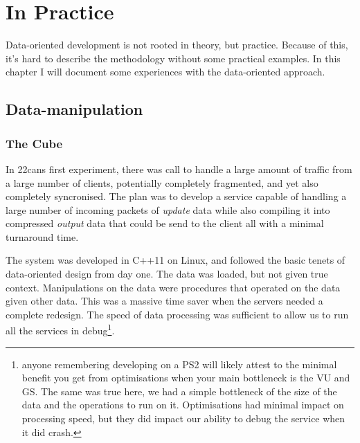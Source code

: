 \chapter{In Practice}\label{chap:inpractice}

Data-oriented development is not rooted in theory, but practice. Because of
this, it's hard to describe the methodology without some practical examples. In
this chapter I will document some experiences with the data-oriented approach.

\section{Data-manipulation}

\subsection{The Cube}

In 22cans first experiment, there was call to handle a large amount of traffic
from a large number of clients, potentially completely fragmented, and yet also
completely syncronised. The plan was to develop a service capable of handling a
large number of incoming packets of \emph{update} data while also compiling it
into compressed \emph{output} data that could be send to the client all with a
minimal turnaround time.

The system was developed in C++11 on Linux, and followed the basic tenets of
data-oriented design from day one. The data was loaded, but not given true
context.  Manipulations on the data were procedures that operated on the data
given other data. This was a massive time saver when the servers needed a
complete redesign. The speed of data processing was sufficient to allow us to
run all the services in debug\footnote{anyone remembering developing on a PS2
will likely attest to the minimal benefit you get from optimisations when your
main bottleneck is the VU and GS. The same was true here, we had a simple
bottleneck of the size of the data and the operations to run on it.
Optimisations had minimal impact on processing speed, but they did impact our
ability to debug the service when it did crash.}.

